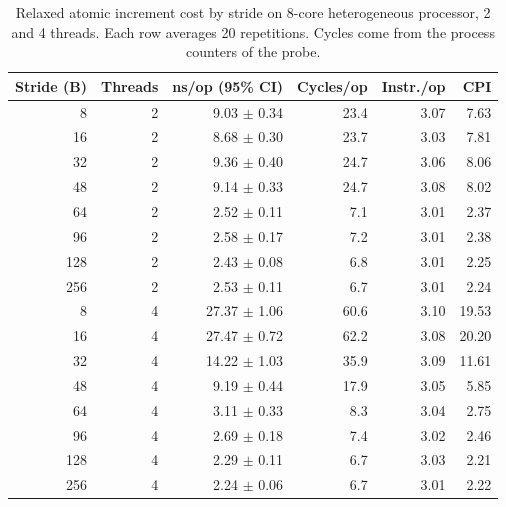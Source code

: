 \begin{table}[!htbp]
\centering
\scriptsize
\setlength{\tabcolsep}{3pt}
\caption{Relaxed atomic increment cost by stride on 8-core heterogeneous processor, 2 and 4 threads. Each row averages 20 repetitions. Cycles come from the process counters of the probe.}
\label{tab:stride}
\begin{tabular}{rrrrrr}
\toprule
Stride (B) & Threads & ns/op (95\% CI) & Cycles/op & Instr./op & CPI\\
\midrule
8 & 2 & 9.03 $\pm$ 0.34 & 23.4 & 3.07 & 7.63 \\
16 & 2 & 8.68 $\pm$ 0.30 & 23.7 & 3.03 & 7.81 \\
32 & 2 & 9.36 $\pm$ 0.40 & 24.7 & 3.06 & 8.06 \\
48 & 2 & 9.14 $\pm$ 0.33 & 24.7 & 3.08 & 8.02 \\
64 & 2 & 2.52 $\pm$ 0.11 & 7.1 & 3.01 & 2.37 \\
96 & 2 & 2.58 $\pm$ 0.17 & 7.2 & 3.01 & 2.38 \\
128 & 2 & 2.43 $\pm$ 0.08 & 6.8 & 3.01 & 2.25 \\
256 & 2 & 2.53 $\pm$ 0.11 & 6.7 & 3.01 & 2.24 \\
8 & 4 & 27.37 $\pm$ 1.06 & 60.6 & 3.10 & 19.53 \\
16 & 4 & 27.47 $\pm$ 0.72 & 62.2 & 3.08 & 20.20 \\
32 & 4 & 14.22 $\pm$ 1.03 & 35.9 & 3.09 & 11.61 \\
48 & 4 & 9.19 $\pm$ 0.44 & 17.9 & 3.05 & 5.85 \\
64 & 4 & 3.11 $\pm$ 0.33 & 8.3 & 3.04 & 2.75 \\
96 & 4 & 2.69 $\pm$ 0.18 & 7.4 & 3.02 & 2.46 \\
128 & 4 & 2.29 $\pm$ 0.11 & 6.7 & 3.03 & 2.21 \\
256 & 4 & 2.24 $\pm$ 0.06 & 6.7 & 3.01 & 2.22 \\
\bottomrule
\end{tabular}
\end{table}
